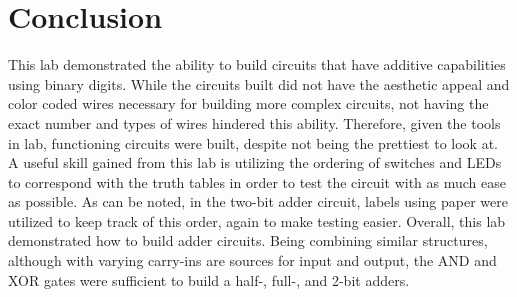 \documentclass[11pt]{article}
\begin{document}
\clearpage

\section*{Conclusion}

This lab demonstrated the ability to build circuits that have additive capabilities using binary digits. While the circuits built did not have the aesthetic appeal and color coded wires necessary for building more complex circuits, not having the exact number and types of wires hindered this ability. Therefore, given the tools in lab, functioning circuits were built, despite not being the prettiest to look at. A useful skill gained from this lab is utilizing the ordering of switches and LEDs to correspond with the truth tables in order to test the circuit with as much ease as possible. As can be noted, in the two-bit adder circuit, labels using paper were utilized to keep track of this order, again to make testing easier. Overall, this lab demonstrated how to build adder circuits. Being combining similar structures, although with varying carry-ins are sources for input and output, the AND and XOR gates were sufficient to build a half-, full-, and 2-bit adders.
\end{document}
